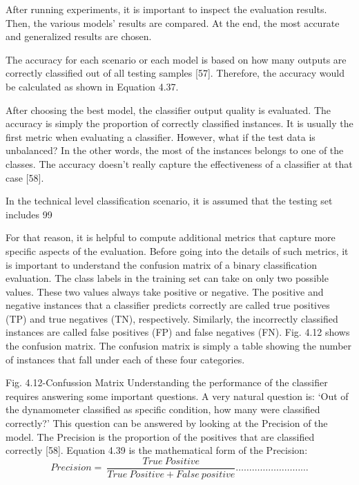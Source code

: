 After running experiments, it is important to inspect the evaluation results. Then, the various models’ results are compared. At the end, the most accurate and generalized results are chosen.   

The accuracy for each scenario or each model is based on how many outputs are correctly classified out of all testing samples [57]. Therefore, the accuracy would be calculated as shown in Equation 4.37.  

After choosing the best model, the classifier output quality is evaluated. The accuracy is simply the proportion of correctly classified instances. It is usually the first metric when evaluating a classifier. However, what if the test data is unbalanced? In the other words, the most of the instances belongs to one of the classes. The accuracy doesn’t really capture the effectiveness of a classifier at that case [58]. 

In the technical level classification scenario, it is assumed that the testing set includes 99%

For that reason, it is helpful to compute additional metrics that capture more specific aspects of the evaluation. Before going into the details of such metrics, it is important to understand the confusion matrix of a binary classification evaluation. The class labels in the training set can take on only two possible values. These two values always take positive or negative. The positive and negative instances that a classifier predicts correctly are called true positives (TP) and true negatives (TN), respectively. Similarly, the incorrectly classified instances are called false positives (FP) and false negatives (FN). Fig. 4.12 shows the confusion matrix. The confusion matrix is simply a table showing the number of instances that fall under each of these four categories. 

Fig. 4.12-Confussion Matrix
Understanding the performance of the classifier requires answering some important questions. A very natural question is: ‘Out of the dynamometer classified as specific condition, how many were classified correctly?’ This question can be answered by looking at the Precision of the model.  The Precision is the proportion of the positives that are classified correctly [58]. Equation 4.39 is the mathematical form of the Precision: 
\begin{equation}
    Precision=\ \frac{True\ Positive}{True\ Positive+False\ positive}\ldots\ldots\ldots\ldots\ldots\ldots\ldots\ldots\ldots
 \end{equation}
   
